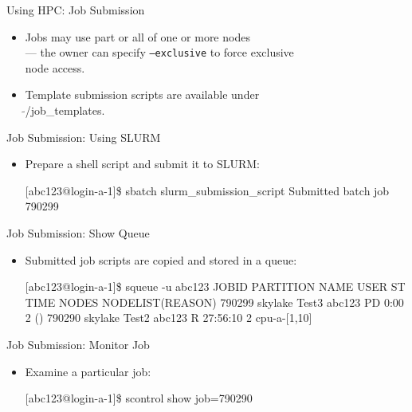 \begin{frame}{Using HPC: Job Submission}
\begin{itemize}
\item{Jobs may use \alert{part} or \alert{all} of one or more nodes\hfill\\
\qquad --- the owner can specify \mbox{\tt --exclusive} to force exclusive\hfill\\\qquad\hphantom{---} node access.}
\item{Template submission scripts are available under\hfill\\
\qquad \alert{$\tilde{}$/job\_templates}.}
\end{itemize}
\end{frame}

\begin{frame}[fragile]{Job Submission: Using SLURM}
\begin{itemize}
\item{Prepare a shell script and submit it to SLURM:}
\begin{semiverbatim}
\scriptsize
[abc123@login-a-1]\$ sbatch slurm_submission_script
Submitted batch job {\color{red}790299}
\end{semiverbatim}
\end{itemize}
\end{frame}

\begin{frame}[fragile]{Job Submission: Show Queue}
\begin{itemize}
\item{Submitted job scripts are copied and stored in a queue:}
\begin{semiverbatim}
\tiny
[abc123@login-a-1]\$ squeue -u abc123
             JOBID PARTITION     NAME     USER ST       TIME  NODES NODELIST(REASON)
            {\color{red}790299}   skylake     Test3  abc123 PD       0:00      2 ()
            790290   skylake     Test2  abc123  R   27:56:10      2 cpu-a-[1,10]
\end{semiverbatim}
\end{itemize}
\end{frame}

\begin{frame}[fragile]{Job Submission: Monitor Job}
\begin{itemize}
\item{Examine a particular job:}
\begin{semiverbatim}
\scriptsize
[abc123@login-a-1]\$ scontrol show job={\color{red}790290}
\end{semiverbatim}
\end{itemize}
\end{frame}

